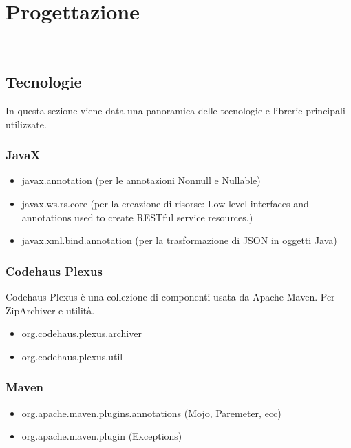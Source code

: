 
\chapter{Progettazione} %
\label{cap:progettazione}

\\

\section{Tecnologie}
\label{sec:tecnologie-strumenti}

In questa sezione viene data una panoramica delle tecnologie e librerie principali utilizzate.

\subsection*{JavaX}
\begin{itemize}
    \item javax.annotation (per le annotazioni Nonnull e Nullable)
    \item javax.ws.rs.core (per la creazione di risorse: Low-level interfaces and annotations used to create RESTful service resources.)
    \item javax.xml.bind.annotation (per la trasformazione di JSON in oggetti Java)
\end{itemize}


\subsection*{Codehaus Plexus}
Codehaus Plexus è una collezione di componenti usata da Apache Maven.
Per ZipArchiver e utilità.
\begin{itemize}
    \item org.codehaus.plexus.archiver
    \item org.codehaus.plexus.util
\end{itemize}

\subsection*{Maven}
\begin{itemize}
    \item org.apache.maven.plugins.annotations (Mojo, Paremeter, ecc)
    \item org.apache.maven.plugin (Exceptions)
\end{itemize}

